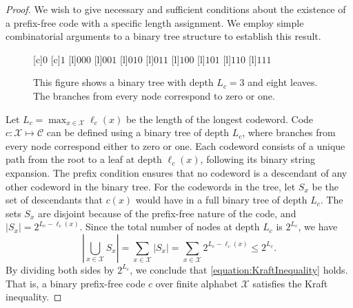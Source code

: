\begin{proof}
We wish to give necessary and sufficient conditions about the existence of a prefix-free code with a specific length assignment.
We employ simple combinatorial arguments to a binary tree structure to establish this result.
\begin{figure}[htbp]
\begin{center}
\begin{psfrags}
[c]{$0$}
[c]{$1$}
[l]{$000$}
[l]{$001$}
[l]{$010$}
[l]{$011$}
[l]{$100$}
[l]{$101$}
[l]{$110$}
[l]{$111$}
\end{psfrags}
\caption{This figure shows a binary tree with depth $L_c = 3$ and eight leaves.  The branches from every node correspond to zero or one.}
\label{figure:BinaryTree}
\end{center}
\end{figure}
Let $L_c = \max_{x \in \mathcal{X}} \ell_c (x)$ be the length of the longest codeword.
Code $c: \mathcal{X} \mapsto \mathcal{C}$ can be defined using a binary tree of depth $L_c$, where branches from every node correspond either to zero or one.
Each codeword consists of a unique path from the root to a leaf at depth $\ell_c(x)$, following its binary string expansion.
The prefix condition ensures that no codeword is a descendant of any other codeword in the binary tree.
For the codewords in the tree, let $S_x$ be the set of descendants that $c(x)$ would have in a full binary tree of depth $L_c$.
The sets $S_x$ are disjoint because of the prefix-free nature of the code, and $|S_x| = 2^{L_c - \ell_c(x)}$.
Since the total number of nodes at depth $L_c$ is $2^{L_c}$, we have
\begin{equation*}
\left| \bigcup_{x \in \mathcal{X}} S_x \right|
= \sum_{x \in \mathcal{X}} |S_x|
= \sum_{x \in \mathcal{X}} 2^{L_c - \ell_c(x)}
\leq 2^{L_c} .
\end{equation*}
By dividing both sides by $2^{L_c}$, we conclude that \eqref{equation:KraftInequality} holds.
That is, a binary prefix-free code $c$ over finite alphabet $\mathcal{X}$ satisfies the Kraft inequality.


\end{proof}
